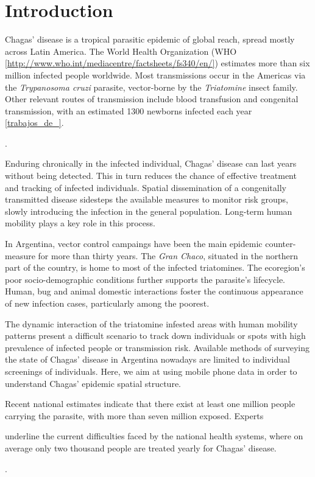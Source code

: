 \section{Introduction}

Chagas' disease is a tropical parasitic epidemic of global reach, spread mostly across Latin America. The World Health Organization (WHO \ref{http://www.who.int/mediacentre/factsheets/fs340/en/}) estimates more than six million infected people worldwide. Most transmissions occur in the Americas via the \textit{Trypanosoma cruzi} parasite, vector-borne by the \textit{Triatomine} insect family. Other relevant routes of transmission include blood transfusion and congenital transmission, with an estimated 1300 newborns infected each year \ref{trabajos_de_}.\begin{comment}  en el drive estan las ppt del min salud \end{comment}. 

Enduring chronically in the infected individual, Chagas' disease can last years without being detected. This in turn reduces the chance of effective treatment and tracking of infected individuals. Spatial dissemination of a congenitally transmitted disease sidesteps the available measures to monitor risk groups, slowly introducing the infection in the general population. Long-term human mobility plays a key role in this process.

In Argentina, vector control campaings have been the main epidemic counter-measure for more than thirty years. The \textit{Gran Chaco}, situated in the northern part of the country, is home to most of the infected triatomines. The ecoregion's poor socio-demographic conditions further supports the parasite's lifecycle. Human, bug and animal domestic interactions foster the continuous appearance of new infection cases, particularly among the poorest.
 
The dynamic interaction of the triatomine infested areas with human mobility patterns present a difficult scenario to track down individuals or spots with high prevalence of infected people or transmission risk. Available methods of surveying the state of Chagas' disease in Argentina nowadays are limited to individual screenings of individuals. Here, we aim at using mobile phone data in order to understand Chagas' epidemic spatial structure.

Recent national estimates indicate that there exist at least one million people carrying the parasite, with more than seven million exposed. Experts \begin{comment}  aca como referencio a Diego Weinberg y Mundo Sano? \end{comment} underline the current difficulties faced by the national health systems, where on average only two thousand people are treated yearly for Chagas' disease.  \begin{comment}  aca nuevamente esta referencia es de MS \end{comment}. 

